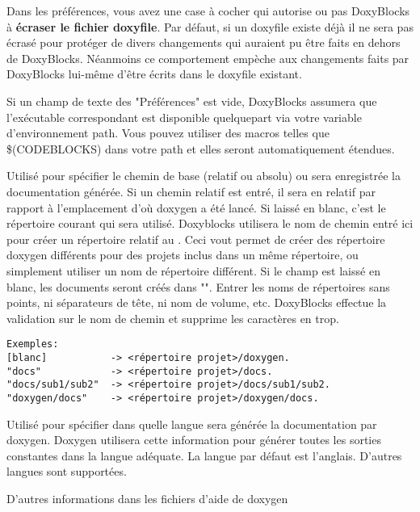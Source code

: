 \begin{description}
\item Dans les préférences, vous avez une case à cocher qui autorise ou pas DoxyBlocks à \textbf{écraser le fichier doxyfile}. Par défaut, si un doxyfile existe déjà il ne sera pas écrasé pour protéger de divers changements qui auraient pu être faits en dehors de DoxyBlocks. Néanmoins ce comportement empèche aux changements faits par DoxyBlocks lui-même d'être écrits dans le doxyfile existant.
\item Si un champ de texte des "Préférences" est vide, DoxyBlocks assumera que l'exécutable correspondant est disponible quelquepart via votre variable d'environnement path. Vous pouvez utiliser des macros telles que \$(CODEBLOCKS) dans votre path et elles seront automatiquement étendues.
\item [OUTPUT\_DIRECTORY] Utilisé pour spécifier le chemin de base (relatif ou absolu) ou sera enregistrée la documentation générée. Si un chemin relatif est entré, il sera en relatif par rapport à l'emplacement d'où doxygen a été lancé. Si laissé en blanc, c'est le répertoire courant qui sera utilisé. Doxyblocks utilisera le nom de chemin entré ici pour créer un répertoire relatif au . Ceci vout permet de créer des répertoire doxygen différents pour des projets inclus dans un même répertoire, ou simplement utiliser un nom de répertoire différent. Si le champ est laissé en blanc, les documents seront créés dans "". Entrer les noms de répertoires sans points, ni séparateurs de tête, ni nom de volume, etc. DoxyBlocks effectue la validation sur le nom de chemin et supprime les caractères en trop.
\begin{verbatim}
Exemples:
[blanc]           -> <répertoire projet>/doxygen.
"docs"            -> <répertoire projet>/docs.
"docs/sub1/sub2"  -> <répertoire projet>/docs/sub1/sub2.
"doxygen/docs"    -> <répertoire projet>/doxygen/docs.
\end{verbatim}
\item [OUTPUT\_LANGUAGE]  Utilisé pour spécifier dans quelle langue sera générée la documentation par doxygen. Doxygen utilisera cette information pour générer toutes les sorties constantes dans la langue adéquate. La langue par défaut est l'anglais. D'autres langues sont supportées. 
\item D'autres informations dans les fichiers d'aide de doxygen
\end{description}